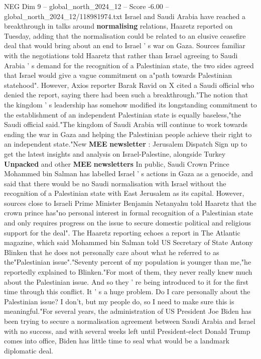 \begin{textsample}{NEG Dim 9 – global\_north\_2024\_12 – Score -6.00 – global\_north\_2024\_12/118981974.txt}  \label{ex:f9_neg_117}
Israel and Saudi Arabia have reached a breakthrough in talks around \textbf{normalising} relations, Haaretz reported on Tuesday, adding that the normalisation could be related to an elusive ceasefire deal that would bring about an end to Israel ' s war on Gaza.
Sources familiar with the negotiations told Haaretz that rather than Israel agreeing to Saudi Arabia ' s demand for the recognition of a Palestinian state, the two sides agreed that Israel would give a vague commitment on a"path towards Palestinian statehood".
However, Axios reporter Barak Ravid on X cited a Saudi official who denied the report, saying there had been such a breakthrough."The notion that the kingdom ' s leadership has somehow modified its longstanding commitment to the establishment of an independent Palestinian state is equally baseless,"the Saudi official said."The kingdom of Saudi Arabia will continue to work towards ending the war in Gaza and helping the Palestinian people achieve their right to an independent state."New \textbf{MEE} \textbf{newsletter} : Jerusalem Dispatch Sign up to get the latest insights and analysis on Israel-Palestine, alongside Turkey \textbf{Unpacked} and other \textbf{MEE} \textbf{newsletters} In public, Saudi Crown Prince Mohammed bin Salman has labelled Israel ' s actions in Gaza as a genocide, and said that there would be no Saudi normalisation with Israel without the recognition of a Palestinian state with East Jerusalem as its capital.
However, sources close to Israeli Prime Minister Benjamin Netanyahu told Haaretz that the crown prince has"no personal interest in formal recognition of a Palestinian state and only requires progress on the issue to secure domestic political and religious support for the deal".
The Haaretz reporting echoes a report in The Atlantic magazine, which said Mohammed bin Salman told US Secretary of State Antony Blinken that he does not personally care about what he referred to as the"Palestinian issue"."Seventy percent of my population is younger than me,"he reportedly explained to Blinken."For most of them, they never really knew much about the Palestinian issue.
And so they ' re being introduced to it for the first time through this conflict.
It ' s a huge problem.
Do I care personally about the Palestinian issue?
I don't, but my people do, so I need to make sure this is meaningful."For several years, the administration of US President Joe Biden has been trying to secure a normalisation agreement between Saudi Arabia and Israel with no success, and with several weeks left until President-elect Donald Trump comes into office, Biden has little time to seal what would be a landmark diplomatic deal.

\end{textsample}
